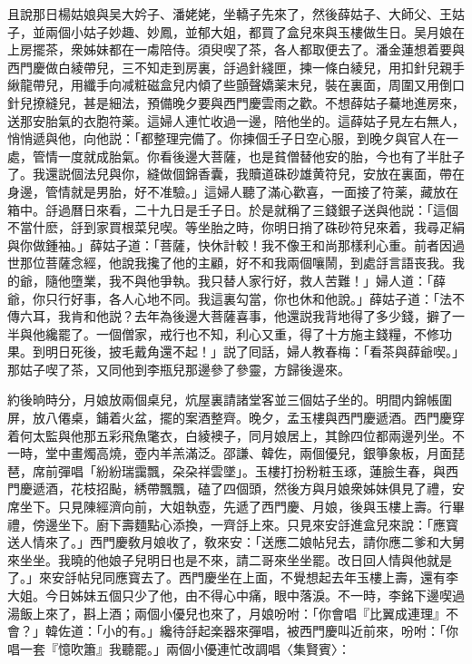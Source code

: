 且說那日楊姑娘與吴大妗子、潘姥姥，坐轎子先來了，然後薛姑子、大師父、王姑子，並兩個小姑子妙趣、妙鳳，並郁大姐，都買了盒兒來與玉樓做生日。吴月娘在上房擺茶，衆姊妹都在一䖏陪侍。須臾喫了茶，各人都取便去了。潘金蓮想着要與西門慶做白綾帶兒，三不知走到房裏，㧱過針綫匣，揀一條白綾兒，用扣針兒親手䋺龍帶兒，用纖手向减粧磁盒兒内傾了些顫聲嬌薬末兒，裝在裏面，周圍又用倒口針兒撩縫兒，甚是細法，預備晚夕要與西門慶雲雨之歡。不想薛姑子驀地進房來，送那安胎氣的衣胞符薬。這婦人連忙收過一邊，陪他坐的。這薛姑子見左右無人，悄悄遞與他，向他説：「都整理完備了。你揀個壬子日空心服，到晚夕與官人在一處，管情一度就成胎氣。你看後邊大菩薩，也是貧僧替他安的胎，今也有了半肚子了。我還説個法兒與你，縫做個錦香囊，我贖道硃砂雄黄符兒，安放在裏面，帶在身邊，管情就是男胎，好不准驗。」這婦人聽了滿心歡喜，一面接了符薬，藏放在箱中。㧱過曆日來看，二十九日是壬子日。於是就稱了三錢銀子送與他説：「這個不當什麽，㧱到家買根菜兒喫。等坐胎之時，你明日捎了硃砂符兒來着，我尋疋絹與你做鍾袖。」薛姑子道：「菩薩，快休計較！我不像王和尚那樣利心重。前者因過世那位菩薩念經，他說我攙了他的主顧，好不和我兩個嚷鬧，到處㧱言語丧我。我的爺，隨他墮業，我不與他爭執。我只替人家行好，救人苦難！」婦人道：「薛爺，你只行好事，各人心地不同。我這裏勾當，你也休和他說。」薛姑子道：「法不傳六耳，我肯和他説？去年為後邊大菩薩喜事，他還説我背地得了多少錢，擗了一半與他纔罷了。一個僧家，戒行也不知，利心又重，得了十方施主錢糧，不修功果。到明日死後，披毛戴角還不起！」説了囘話，婦人教春梅：「看茶與薛爺喫。」那姑子喫了茶，又同他到李瓶兒那邊參了參靈，方歸後邊來。

約後晌時分，月娘放兩個桌兒，炕屋裏請諸堂客並三個姑子坐的。明間内錦帳圍屏，放八僊桌，鋪着火盆，擺的案酒整齊。晚夕，孟玉樓與西門慶遞酒。西門慶穿着何太監與他那五彩飛魚氅衣，白綾襖子，同月娘居上，其餘四位都兩邊列坐。不一時，堂中畫燭高燒，壺内羊羔滿泛。邵謙、韓佐，兩個優兒，銀箏象板，月面琵琶，席前彈唱「紛紛瑞靄飄，朶朶祥雲墜」。玉樓打扮粉粧玉琢，蓮臉生春，與西門慶遞酒，花枝招颭，綉帶飄飄，磕了四個頭，然後方與月娘衆姊妹俱見了禮，安席坐下。只見陳經濟向前，大姐執壺，先遞了西門慶、月娘，後與玉樓上壽。行畢禮，傍邊坐下。廚下壽麵點心添換，一齊㧱上來。只見來安㧱進盒兒來說：「應寳送人情來了。」西門慶敎月娘收了，敎來安：「送應二娘帖兒去，請你應二爹和大舅來坐坐。我曉的他娘子兒明日也是不來，請二哥來坐坐罷。改日回人情與他就是了。」來安㧱帖兒同應寳去了。西門慶坐在上面，不覺想起去年玉樓上壽，還有李大姐。今日姊妹五個只少了他，由不得心中痛，眼中落淚。不一時，李銘下邊喫過湯飯上來了，斟上酒；兩個小優兒也來了，月娘吩咐：「你會唱『比翼成連理』不會？」韓佐道：「小的有。」纔待㧱起楽器來彈唱，被西門慶叫近前來，吩咐：「你唱一套『憶吹簫』我聽罷。」兩個小優連忙改調唱〈集賢賓〉：

